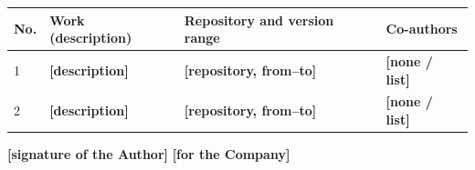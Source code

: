 \documentclass[12pt,a4paper]{report}
\newcommand{\field}[1]{\textbf{[#1]}}
\begin{document}
\begin{center}
\begin{tabularx}{\linewidth}{@{}p{0.75cm} >{\raggedright\arraybackslash}X >{\raggedright\arraybackslash}p{4.4cm} >{\raggedright\arraybackslash}p{3.0cm}@{}}
\toprule
\textbf{No.} & \textbf{Work (description)} & \textbf{Repository and version range} & \textbf{Co-authors} \\
\midrule
1 & \field{description} & \field{repository, from--to} & \field{none / list} \\
2 & \field{description} & \field{repository, from--to} & \field{none / list} \\
\bottomrule
\end{tabularx}
\end{center}

\field{signature of the Author} \hfill \field{for the Company}

\end{document}
